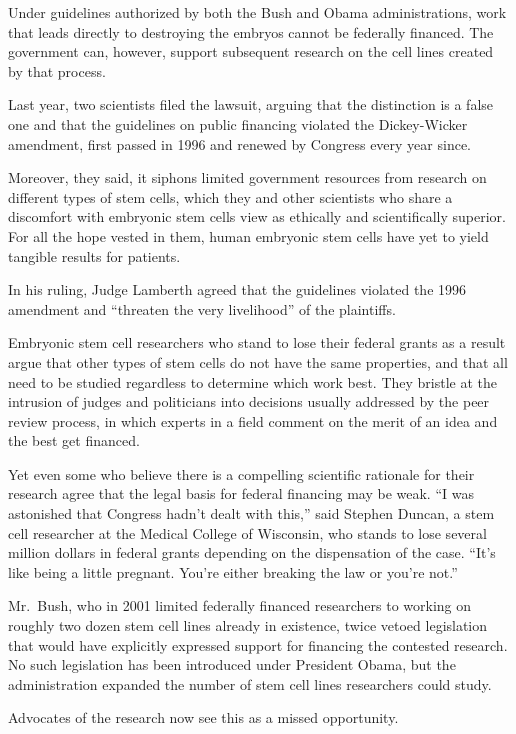 ﻿\documentclass[12pt]{article}
\begin{document}
Under guidelines authorized by both the Bush and Obama administrations, work that leads directly to
destroying the embryos cannot be federally financed. The government can, however, support subsequent
research on the cell lines created by that process.

Last year, two scientists filed the lawsuit, arguing that the distinction is a false one and that
the guidelines on public financing violated the Dickey-Wicker amendment, first passed in 1996 and
renewed by Congress every year since.

Moreover, they said, it siphons limited government resources from research on different types of
stem cells, which they and other scientists who share a discomfort with embryonic stem cells view as
ethically and scientifically superior. For all the hope vested in them, human embryonic stem cells
have yet to yield tangible results for patients.

In his ruling, Judge Lamberth agreed that the guidelines violated the 1996 amendment and ``threaten
the very livelihood'' of the plaintiffs.

Embryonic stem cell researchers who stand to lose their federal grants as a result argue that other
types of stem cells do not have the same properties, and that all need to be studied regardless to
determine which work best. They bristle at the intrusion of judges and politicians into decisions
usually addressed by the peer review process, in which experts in a field comment on the merit of an
idea and the best get financed.

Yet even some who believe there is a compelling scientific rationale for their research agree that
the legal basis for federal financing may be weak. ``I was astonished that Congress hadn't dealt
with this,'' said Stephen Duncan, a stem cell researcher at the Medical College of Wisconsin, who
stands to lose several million dollars in federal grants depending on the dispensation of the case.
``It's like being a little pregnant. You're either breaking the law or you're not.''

Mr.~Bush, who in 2001 limited federally financed researchers to working on roughly two dozen stem
cell lines already in existence, twice vetoed legislation that would have explicitly expressed
support for financing the contested research. No such legislation has been introduced under
President Obama, but the administration expanded the number of stem cell lines researchers could
study.

Advocates of the research now see this as a missed opportunity.
\end{document}
